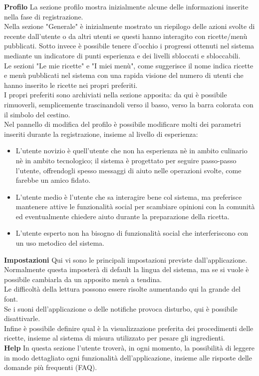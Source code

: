 \textbf{Profilo}
La sezione profilo mostra inizialmente alcune delle informazioni inserite nella fase di registrazione.\\
Nella sezione "Generale" è inizialmente mostrato un riepilogo delle azioni svolte di recente dall'utente o da altri utenti se questi hanno interagito con ricette/menù pubblicati. Sotto invece è possibile tenere d'occhio i progressi ottenuti nel sistema mediante un indicatore di punti esperienza e dei livelli sbloccati e sbloccabili.\\
Le sezioni "Le mie ricette" e "I miei menù", come suggerisce il nome indica ricette e menù pubblicati nel sistema con una rapida visione del numero di utenti che hanno inserito le ricette nei propri preferiti.\\
I propri preferiti sono archiviati nella sezione apposita: da qui è possibile rimuoverli, semplicemente trascinandoli verso il basso, verso la barra colorata con il simbolo del cestino.\\
Nel pannello di modifica del profilo è possibile modificare molti dei parametri inseriti durante la registrazione, insieme al livello di esperienza:
\begin{itemize}
\item L'utente novizio è quell'utente che non ha esperienza nè in ambito culinario nè in ambito tecnologico; il sistema è progettato per seguire passo-passo l'utente, offrendogli spesso messaggi di aiuto nelle operazioni svolte, come farebbe un amico fidato.
\item L'utente medio è l'utente che sa interagire bene col sistema, ma preferisce mantenere attive le funzionalità social per scambiare opinioni con la comunità ed eventualmente chiedere aiuto durante la preparazione della ricetta.
\item L'utente esperto non ha bisogno di funzionalità social che interferiscono con un uso metodico del sistema. 
\end{itemize}

\textbf{Impostazioni}
Qui vi sono le principali impostazioni previste dall'applicazione.\\ Normalmente questa imposterà di default la lingua del sistema, ma se si vuole è possibile cambiarla da un apposito menù a tendina.\\
Le difficoltà della lettura possono essere risolte aumentando qui la grande del font.\\
Se i suoni dell'applicazione o delle notifiche provoca disturbo, qui è possibile disattivarle.\\
Infine è possibile definire qual è la visualizzazione preferita dei procedimenti delle ricette, insieme al sistema di misura utilizzato per pesare gli ingredienti.\\

\textbf{Help}
In questa sezione l'utente troverà, in ogni momento, la possibilità di leggere in modo dettagliato ogni funzionalità dell'applicazione, insieme alle risposte delle domande più frequenti (FAQ).
